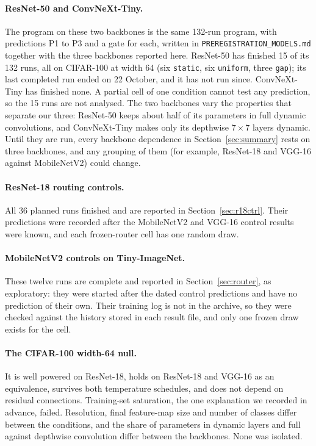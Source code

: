 \documentclass[10pt,a4paper]{article}
\begin{document}
\paragraph{ResNet-50 and ConvNeXt-Tiny.} The program on these two backbones
is the same 132-run program, with predictions P1 to P3 and a gate for each,
written in \texttt{PREREGISTRATION\_MODELS.md} together with the three
backbones reported here. ResNet-50 has finished 15 of its 132 runs, all on
CIFAR-100 at width 64 (six \texttt{static}, six \texttt{uniform}, three
\texttt{gap}); its last completed run ended on 22 October, and it has not run
since. ConvNeXt-Tiny has finished none. A partial cell of one condition cannot
test any prediction, so the 15 runs are not analysed. The two backbones vary
the properties that separate our three: ResNet-50 keeps about half of its
parameters in full dynamic convolutions, and ConvNeXt-Tiny makes only its
depthwise $7\times7$ layers dynamic. Until they are run, every backbone
dependence in Section~\ref{sec:summary} rests on three backbones, and any
grouping of them (for example, ResNet-18 and VGG-16 against MobileNetV2) could
change.

\paragraph{ResNet-18 routing controls.} All 36 planned runs finished and are reported in
Section~\ref{sec:r18ctrl}. Their predictions were recorded after the
MobileNetV2 and VGG-16 control results were known, and each frozen-router cell
has one random draw.

\paragraph{MobileNetV2 controls on Tiny-ImageNet.} These twelve runs are
complete and reported in Section~\ref{sec:router}, as exploratory: they were
started after the dated control predictions and have no prediction of their own.
Their training log is not in the archive, so they were checked against the
history stored in each result file, and only one frozen draw exists for the
cell.

\paragraph{The CIFAR-100 width-64 null.} It is well powered on ResNet-18,
holds on ResNet-18 and VGG-16 as an equivalence, survives both temperature
schedules, and does not depend on residual connections. Training-set
saturation, the one explanation we recorded in advance, failed. Resolution,
final feature-map size and number of classes differ between the conditions,
and the share of parameters in dynamic layers and full against depthwise
convolution differ between the backbones. None was isolated.
\end{document}
